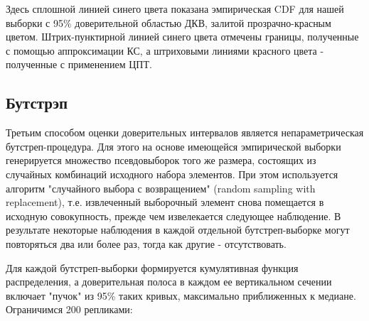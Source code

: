 \documentclass[14pt,a4paper]{scrartcl}
\begin{document}
\pagebreak
Здесь сплошной линией синего цвета показана эмпирическая CDF для нашей выборки с 95\% доверительной областью ДКВ, залитой прозрачно-красным цветом.  Штрих-пунктирной линией синего цвета отмечены границы, полученные с помощью аппроксимации КС, а штриховыми линиями красного цвета - полученные с применением ЦПТ.

\subsection{Бутстрэп}
Третьим способом оценки доверительных интервалов является непараметрическая бутстреп-процедура. Для этого на основе имеющейся эмпирической выборки генерируется множество псевдовыборок того же размера, состоящих из случайных комбинаций исходного набора элементов. При этом используется алгоритм "случайного выбора с возвращением" (random sampling with replacement), т.е. извлеченный выборочный элемент снова помещается в исходную совокупность, прежде чем извелекается следующее наблюдение. В результате некоторые наблюдения в каждой отдельной бутстреп-выборке могут повторяться два или более раз, тогда как другие - отсутствовать.

Для каждой бутстреп-выборки формируется кумулятивная функция распределения, а доверительная полоса в каждом ее вертикальном сечении включает "пучок" из 95\% таких кривых, максимально приближенных к медиане. Ограничимся 200 репликами:
\pagebreak
\end{document}
